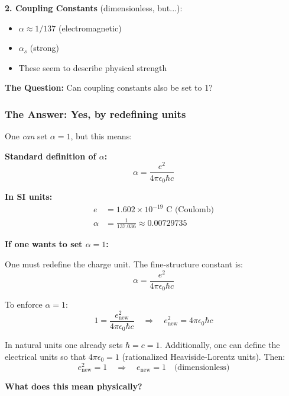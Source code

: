 \textbf{2. Coupling Constants} (dimensionless, but...):
\begin{itemize}[nosep]
	\item $\alpha \approx 1/137$ (electromagnetic)
	\item $\alpha_s$ (strong)
	\item These seem to describe physical strength
\end{itemize}

\textbf{The Question:} Can coupling constants also be set to 1?

\subsubsection{The Answer: Yes, by redefining units}

One \textit{can} set $\alpha = 1$, but this means:

\textbf{Standard definition of $\alpha$:}
\begin{equation}
	\alpha = \frac{e^2}{4\pi\epsilon_0 \hbar c}
\end{equation}

\textbf{In SI units:}
\begin{align}
	e &= 1.602 \times 10^{-19} \text{ C (Coulomb)} \\
	\alpha &= \frac{1}{137.036} \approx 0.00729735
\end{align}

\textbf{If one wants to set $\alpha = 1$:}

One must redefine the charge unit. The fine-structure constant is:
\begin{equation}
	\alpha = \frac{e^2}{4\pi\epsilon_0 \hbar c}
\end{equation}

To enforce $\alpha = 1$:
\begin{equation}
	1 = \frac{e_{\text{new}}^2}{4\pi\epsilon_0 \hbar c} \quad \Rightarrow \quad e_{\text{new}}^2 = 4\pi\epsilon_0 \hbar c
\end{equation}

In natural units one already sets $\hbar = c = 1$. Additionally, one can define the electrical units so that $4\pi\epsilon_0 = 1$ (rationalized Heaviside-Lorentz units). Then:
\begin{equation}
	e_{\text{new}}^2 = 1 \quad \Rightarrow \quad e_{\text{new}} = 1 \quad \text{(dimensionless)}
\end{equation}

\textbf{What does this mean physically?}

